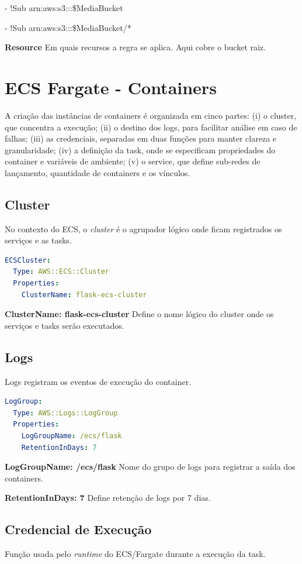 - !Sub arn:aws:s3:::\${MediaBucket}

- !Sub arn:aws:s3:::\${MediaBucket}/*

\textbf{Resource} Em quais recursos a regra se aplica. Aqui cobre o bucket raiz.


\section{ECS Fargate - Containers}
A criação das instâncias de containers é organizada em cinco partes: (i) o cluster, que concentra a execução; (ii) o destino dos logs, para facilitar análise em caso de falhas; (iii) as credenciais, separadas em duas funções para manter clareza e granularidade; (iv) a definição da task, onde se especificam propriedades do container e variáveis de ambiente; (v) o service, que define sub-redes de lançamento, quantidade de containers e os vínculos. 

\subsection{Cluster}
No contexto do ECS, o \textit{cluster} é o agrupador lógico onde ficam registrados os serviços e as tasks.

\begin{lstlisting}[language=YAML]
ECSCluster:
  Type: AWS::ECS::Cluster
  Properties:
    ClusterName: flask-ecs-cluster
\end{lstlisting}

\textbf{ClusterName: flask-ecs-cluster} Define o nome lógico do cluster onde os serviços e tasks serão executados.

\subsection{Logs}
Logs registram os eventos de execução do container.
 

\begin{lstlisting}[language=YAML]
LogGroup:
  Type: AWS::Logs::LogGroup
  Properties:
    LogGroupName: /ecs/flask
    RetentionInDays: 7
\end{lstlisting}

\textbf{LogGroupName: /ecs/flask} Nome do grupo de logs para registrar a saída dos containers.

\textbf{RetentionInDays: 7} Define retenção de logs por 7 dias.

\subsection{Credencial de Execução}
Função usada pelo \textit{runtime} do ECS/Fargate durante a execução da task.

